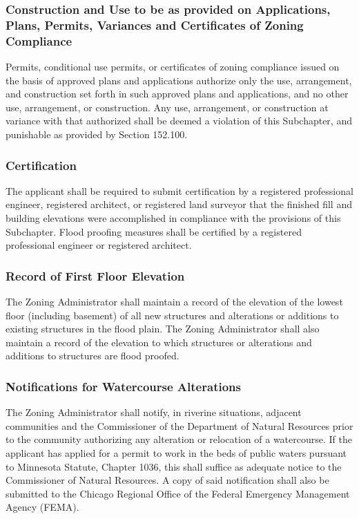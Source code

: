 \subsubsection{Construction and Use to be as provided on Applications, Plans, Permits, Variances and Certificates of Zoning Compliance}
Permits, conditional use permits, or certificates of zoning compliance issued on the basis of approved plans and applications authorize only the use, arrangement, and construction set forth in such approved plans and applications, and no other use, arrangement, or construction. Any use, arrangement, or construction at variance with that authorized shall be deemed a violation of this Subchapter, and punishable as provided by Section 152.100.
\subsubsection{Certification}
The applicant shall be required to submit certification by a registered professional engineer, registered architect, or registered land surveyor that the finished fill and building elevations were accomplished in compliance with the provisions of this Subchapter. Flood proofing measures shall be certified by a registered professional engineer or registered architect.
\subsubsection{Record of First Floor Elevation}
The Zoning Administrator shall maintain a record of the elevation of the lowest floor (including basement) of all new structures and alterations or additions to existing structures in the flood plain. The Zoning Administrator shall also maintain a record of the elevation to which structures or alterations and additions to structures are flood proofed.
\subsubsection{Notifications for Watercourse Alterations}
The Zoning Administrator shall notify, in riverine situations, adjacent communities and the Commissioner of the Department of Natural Resources prior to the community authorizing any alteration or relocation of a watercourse. If the applicant has applied for a permit to work in the beds of public waters pursuant to Minnesota Statute, Chapter 1036, this shall suffice as adequate notice to the Commissioner of Natural Resources. A copy of said notification shall also be submitted to the Chicago Regional Office of the Federal Emergency Management Agency (FEMA).
